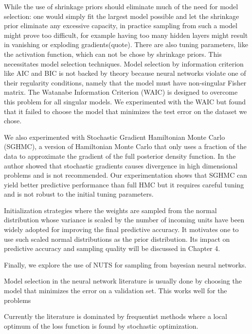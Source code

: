\documentclass[]{report}
\begin{document}
While the use of shrinkage priors should eliminate much of the need for model selection: one would simply fit the largest model possible and let the shrinkage prior eliminate any excessive capacity, in practice sampling from such a model might prove too difficult, for example having too many hidden layers might result in vanishing or exploding gradients(quote). There are also tuning parameters, like the activation function, which can not be chose by shrinkage priors. This necessitates model selection techniques. Model selection by information criterion like AIC and BIC is not backed by theory because neural networks violate one of their regularity conditions, namely that the model must have non-singular Fisher matrix. The Watanabe Information Criterion (WAIC) is designed to overcome this problem for all singular models. We experimented with the WAIC but found that it failed to choose the model that minimizes the test error on the dataset we chose. 

We also experimented with Stochastic Gradient Hamiltonian Monte Carlo (SGHMC), a version of Hamiltonian Monte Carlo that only uses a fraction of the data to approximate the gradient of the full posterior density function. In \cite{betancourt2015fundamental} the author showed that stochastic gradients causes divergence in high dimensional problems and is not recommended. Our experimentation shows that SGHMC can yield better predictive performance than full HMC but it requires careful tuning and is not robust to the initial tuning parameters. 

Initialization strategies where the weights are sampled from the normal distribution whose variance is scaled by the number of incoming units have been widely adopted for improving the final predictive accuracy. It motivates one to use such scaled normal distributions as the prior distribution. Its impact on predictive accuracy and sampling quality will be discussed in Chapter 4. 

Finally, we explore the use of NUTS for sampling from bayesian neural networks.

Model selection in the neural network literature is usually done by choosing the model that minimizes the error on a validation set. This works well for the problems 







Currently the literature is dominated by frequentist methods where a local optimum of the loss function is found by stochastic optimization. 
\end{document}
